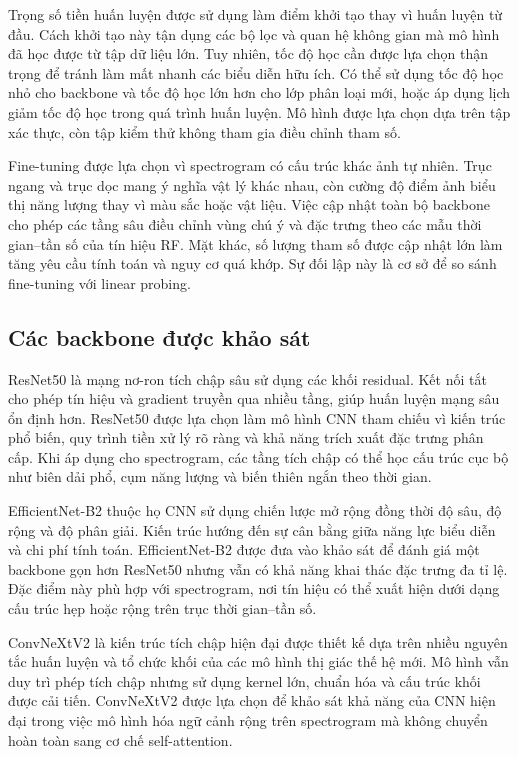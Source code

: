\documentclass[../DoAn.tex]{subfiles}
\begin{document}
Trọng số tiền huấn luyện được sử dụng làm điểm khởi tạo thay vì huấn luyện từ đầu. Cách khởi tạo này tận dụng các bộ lọc và quan hệ không gian mà mô hình đã học được từ tập dữ liệu lớn. Tuy nhiên, tốc độ học cần được lựa chọn thận trọng để tránh làm mất nhanh các biểu diễn hữu ích. Có thể sử dụng tốc độ học nhỏ cho backbone và tốc độ học lớn hơn cho lớp phân loại mới, hoặc áp dụng lịch giảm tốc độ học trong quá trình huấn luyện. Mô hình được lựa chọn dựa trên tập xác thực, còn tập kiểm thử không tham gia điều chỉnh tham số.

Fine-tuning được lựa chọn vì spectrogram có cấu trúc khác ảnh tự nhiên. Trục ngang và trục dọc mang ý nghĩa vật lý khác nhau, còn cường độ điểm ảnh biểu thị năng lượng thay vì màu sắc hoặc vật liệu. Việc cập nhật toàn bộ backbone cho phép các tầng sâu điều chỉnh vùng chú ý và đặc trưng theo các mẫu thời gian--tần số của tín hiệu RF. Mặt khác, số lượng tham số được cập nhật lớn làm tăng yêu cầu tính toán và nguy cơ quá khớp. Sự đối lập này là cơ sở để so sánh fine-tuning với linear probing.

\subsection{Các backbone được khảo sát}

ResNet50 là mạng nơ-ron tích chập sâu sử dụng các khối residual. Kết nối tắt cho phép tín hiệu và gradient truyền qua nhiều tầng, giúp huấn luyện mạng sâu ổn định hơn. ResNet50 được lựa chọn làm mô hình CNN tham chiếu vì kiến trúc phổ biến, quy trình tiền xử lý rõ ràng và khả năng trích xuất đặc trưng phân cấp. Khi áp dụng cho spectrogram, các tầng tích chập có thể học cấu trúc cục bộ như biên dải phổ, cụm năng lượng và biến thiên ngắn theo thời gian.

EfficientNet-B2 thuộc họ CNN sử dụng chiến lược mở rộng đồng thời độ sâu, độ rộng và độ phân giải. Kiến trúc hướng đến sự cân bằng giữa năng lực biểu diễn và chi phí tính toán. EfficientNet-B2 được đưa vào khảo sát để đánh giá một backbone gọn hơn ResNet50 nhưng vẫn có khả năng khai thác đặc trưng đa tỉ lệ. Đặc điểm này phù hợp với spectrogram, nơi tín hiệu có thể xuất hiện dưới dạng cấu trúc hẹp hoặc rộng trên trục thời gian--tần số.

ConvNeXtV2 là kiến trúc tích chập hiện đại được thiết kế dựa trên nhiều nguyên tắc huấn luyện và tổ chức khối của các mô hình thị giác thế hệ mới. Mô hình vẫn duy trì phép tích chập nhưng sử dụng kernel lớn, chuẩn hóa và cấu trúc khối được cải tiến. ConvNeXtV2 được lựa chọn để khảo sát khả năng của CNN hiện đại trong việc mô hình hóa ngữ cảnh rộng trên spectrogram mà không chuyển hoàn toàn sang cơ chế self-attention.
\end{document}

